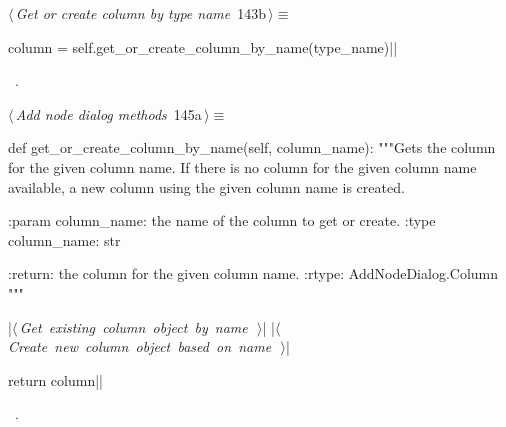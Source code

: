 \documentclass[%
    a4paper,    %
    justified,  %
    nobib,      %
    openany     %
]{tufte-book}
\begin{document}
%
\begin{flushleft} \small
\begin{minipage}{\linewidth}\label{scrap156}\raggedright\small
{} $\langle\,${\itshape Get or create column by type name}\nobreak\ {\footnotesize {143b}}$\,\rangle\equiv$
\vspace{-1ex}
\begin{pythoncode}
    column = self.get_or_create_column_by_name(type_name)|\NWsep|
\end{pythoncode}
\vspace{1.5ex}
\footnotesize
\begin{list}{}{\setlength{\itemsep}{-\parsep}\setlength{\itemindent}{-\leftmargin}}
\item \NWtxtMacroRefIn\ .

\item{}
\end{list}
\end{minipage}\vspace{4ex}
\end{flushleft}
%
\begin{flushleft} \small
\begin{minipage}{\linewidth}\label{scrap157}\raggedright\small
{} $\langle\,${\itshape Add node dialog methods}\nobreak\ {\footnotesize {145a}}$\,\rangle\equiv$
\vspace{-1ex}
\begin{pythoncode}
def get_or_create_column_by_name(self, column_name):
    """Gets the column for the given column name.
    If there is no column for the given column name available, a new column
    using the given column name is created.

    :param column_name: the name of the column to get or create.
    :type  column_name: str

    :return: the column for the given column name.
    :rtype:  AddNodeDialog.Column
    """

    |\hbox{$\langle\,${\itshape Get existing column object by name}\nobreak\ {\footnotesize {}}$\,\rangle$}|
    |\hbox{$\langle\,${\itshape Create new column object based on name}\nobreak\ {\footnotesize {}}$\,\rangle$}|

    return column|\NWsep|
\end{pythoncode}
\vspace{1.5ex}
\footnotesize
\begin{list}{}{\setlength{\itemsep}{-\parsep}\setlength{\itemindent}{-\leftmargin}}
\item \NWtxtMacroRefIn\ .

\item{}
\end{list}
\end{minipage}\vspace{4ex}
\end{flushleft}
\end{document}
